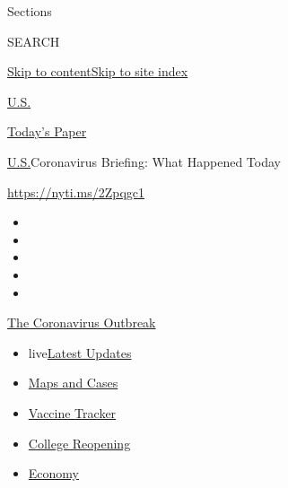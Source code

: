 Sections

SEARCH

\protect\hyperlink{site-content}{Skip to
content}\protect\hyperlink{site-index}{Skip to site index}

\href{https://www.nytimes.com/section/us}{U.S.}

\href{https://myaccount.nytimes.com/auth/login?response_type=cookie\&client_id=vi}{}

\href{https://www.nytimes.com/section/todayspaper}{Today's Paper}

\href{/section/us}{U.S.}\textbar{}Coronavirus Briefing: What Happened
Today

\url{https://nyti.ms/2Zpqgc1}

\begin{itemize}
\item
\item
\item
\item
\item
\end{itemize}

\href{https://www.nytimes.com/news-event/coronavirus?action=click\&pgtype=Article\&state=default\&region=TOP_BANNER\&context=storylines_menu}{The
Coronavirus Outbreak}

\begin{itemize}
\tightlist
\item
  live\href{https://www.nytimes.com/2020/08/04/world/coronavirus-cases.html?action=click\&pgtype=Article\&state=default\&region=TOP_BANNER\&context=storylines_menu}{Latest
  Updates}
\item
  \href{https://www.nytimes.com/interactive/2020/us/coronavirus-us-cases.html?action=click\&pgtype=Article\&state=default\&region=TOP_BANNER\&context=storylines_menu}{Maps
  and Cases}
\item
  \href{https://www.nytimes.com/interactive/2020/science/coronavirus-vaccine-tracker.html?action=click\&pgtype=Article\&state=default\&region=TOP_BANNER\&context=storylines_menu}{Vaccine
  Tracker}
\item
  \href{https://www.nytimes.com/2020/08/02/us/covid-college-reopening.html?action=click\&pgtype=Article\&state=default\&region=TOP_BANNER\&context=storylines_menu}{College
  Reopening}
\item
  \href{https://www.nytimes.com/live/2020/08/04/business/stock-market-today-coronavirus?action=click\&pgtype=Article\&state=default\&region=TOP_BANNER\&context=storylines_menu}{Economy}
\end{itemize}

